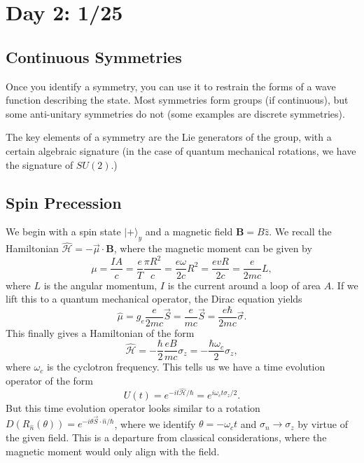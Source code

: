 \documentclass[fontsize=12pt]{scrartcl}
\newcommand{\bv}[1]{\mathrm{\textbf{#1}}}
\newcommand{\ra}{\rangle}
\newcommand{\Ham}{\hat{\mathcal{H}}}
\begin{document}
\section{Day 2: 1/25}

\subsection{Continuous Symmetries}

Once you identify a symmetry, you can use it to restrain the forms of a wave function describing the state. Most symmetries form groups (if continuous), but some anti-unitary symmetries do not (some examples are discrete symmetries).

The key elements of a symmetry are the Lie generators of the group, with a certain algebraic signature (in the case of quantum mechanical rotations, we have the signature of $SU(2)$.) 

\subsection{Spin Precession}

We begin with a spin state $|+\ra_y$ and a magnetic field $\bv{B}=B\hat{z}$. We recall the Hamiltonian $\Ham=-\vec{\mu}\cdot\bv{B}$, where the magnetic moment can be given by $$\mu = \frac{IA}{c}=\frac{e}{T}\frac{\pi R^2}{c}=\frac{e\omega}{2c} R^2 = \frac{evR}{2c}=\frac{e}{2mc}L,$$ where $L$ is the angular momentum, $I$ is the current around a loop of area $A$. If we lift this to a quantum mechanical operator, the Dirac equation yields $$\hat{\mu}=g_e \frac{e}{2mc}\vec{S}=\frac{e}{mc}\vec{S}=\frac{e\hbar}{2mc}\vec{\sigma}.$$ This finally gives a Hamiltonian of the form $$\Ham = -\frac{\hbar}{2} \frac{eB}{mc}\sigma_z = -\frac{\hbar\omega_c}{2}\sigma_z,$$ where $\omega_c$ is the cyclotron frequency. This tells us we have a time evolution operator of the form $$U(t)=e^{-it\Ham/\hbar}=e^{i\omega_c t\sigma_z/2}.$$ But this time evolution operator looks similar to a rotation $D(R_{\hat{n}}(\theta))=e^{-i\theta \vec{S}\cdot\hat{n}/\hbar}$, where we identify $\theta=-\omega_ct$ and $\sigma_n\to \sigma_z$ by virtue of the given field. This is a departure from classical considerations, where the magnetic moment would only align with the field.
\end{document}
